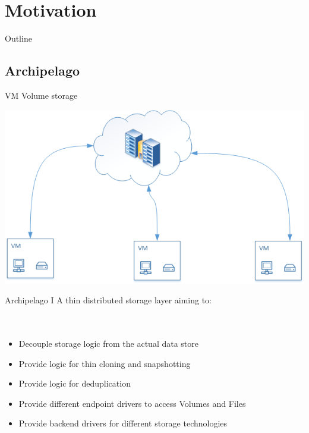\section{Motivation}

\begin{frame}[t]{Outline}
\setcounter{tocdepth}{1}
\tableofcontents[currentsection]
\end{frame}

\subsection{Archipelago}
\begin{frame}{VM Volume storage}
\begin{center}
    \includegraphics[scale=0.5]{images/cloud-storage.png} \\
\end{center}
\end{frame}

\begin{frame}{Archipelago I}
A thin distributed storage layer aiming to:
\hfill \\
\hfill \\
\hfill \\
\begin{itemize}
\item Decouple storage logic from the actual data store
\item Provide logic for thin cloning and snapshotting
\item Provide logic for deduplication
\item Provide different endpoint drivers to access Volumes and Files
\item Provide backend drivers for different storage technologies
\end{itemize}
\end{frame}

